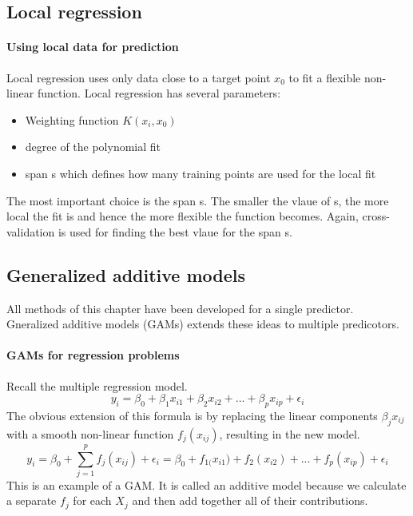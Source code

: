 \documentclass[../document.tex]{subfiles}
\begin{document}
	\subsection{Local regression}
	\paragraph{Using local data for prediction}
	Local regression uses only data close to a target point \(x_{0}\) to fit a flexible non-linear function. Local regression has several parameters:
	\begin{itemize}
		\item Weighting function \(K(x_{i},x_{0})\)
		\item degree of the polynomial fit
		\item span s which defines how many training points are used for the local fit
	\end{itemize}
	The most important choice is the span s. The smaller the vlaue of s, the more local the fit is and hence the more flexible the function becomes. Again, cross-validation is used for finding the best vlaue for the span s.
	\subsection{Generalized additive models}
	All methods of this chapter have been developed for a single predictor. Gneralized additive models (GAMs) extends these ideas to multiple predicotors.
	\paragraph{GAMs for regression problems}
	Recall the multiple regression model.
	\begin{equation}
		y_{i}=\beta_{0}+\beta_{1}x_{i1}+\beta_{2}x_{i2}+...+\beta_{p}x_{ip}+\epsilon_{i}
	\end{equation}
	The obvious extension of this formula is by replacing the linear components \(\beta_{j}x_{ij}\) with a smooth non-linear function \(f_{j}(x_{ij})\), resulting in the new model.
	\begin{equation}
		y_{i}=\beta_{0}+\sum_{j=1}^{p}f_{j}(x_{ij})+\epsilon_{i} = \beta_{0}+f_{1(}x_{i1})+f_{2}(x_{i2})+...+f_{p}(x_{ip})+\epsilon_{i}
	\end{equation}
	This is an example of a GAM. It is called an additive model because we calculate a separate \(f_{j}\) for each \(X_{j}\) and then add together all of their contributions. 
\end{document}
